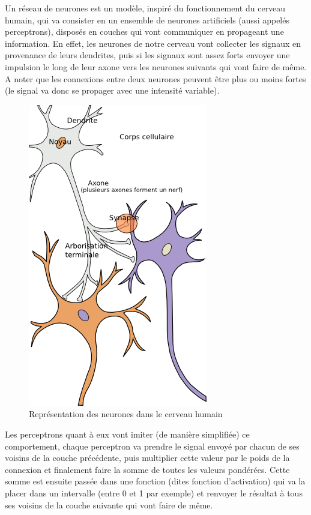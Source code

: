 \documentclass{article}
\begin{document}
Un réseau de neurones est un modèle, inspiré du fonctionnement du cerveau humain, qui va consister en un ensemble de neurones artificiels (aussi appelés perceptrons), disposés en couches qui vont communiquer en propageant une information\cite{wikiann}. En effet, les neurones de notre cerveau vont collecter les signaux en provenance de leurs dendrites, puis si les signaux sont assez forts envoyer une impulsion le long de leur axone vers les neurones suivants qui vont faire de même. A noter que les connexions entre deux neurones peuvent être plus ou moins fortes (le signal va donc se propager avec une intensité variable)\cite{neuronswork}.

\begin{figure}[H]
\begin{center}
	\includegraphics[scale=0.5]{neurones.png}
	\caption{Représentation des neurones dans le cerveau humain \cite{neurons}}
\end{center}
\end{figure}

Les perceptrons quant à eux vont imiter (de manière simplifiée) ce comportement, chaque perceptron va prendre le signal envoyé par chacun de ses voisins de la couche précédente, puis multiplier cette valeur par le poids de la connexion et finalement faire la somme de toutes les valeurs pondérées. Cette somme est ensuite passée dans une fonction (dites fonction d'activation) qui va la placer dans un intervalle (entre 0 et 1 par exemple) et renvoyer le résultat à tous ses voisins de la couche suivante qui vont faire de même\cite{wikiperceptron}.
\end{document}
